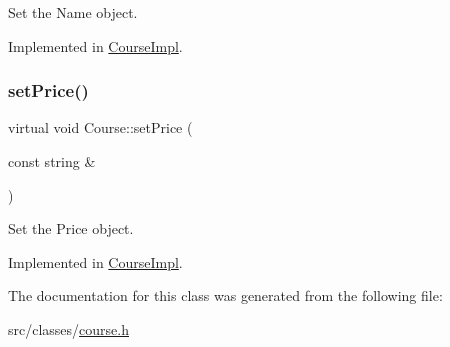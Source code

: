 Set the Name object. 



Implemented in \hyperlink{classCourseImpl_af831a30978ba95ab38c90cb82d14ed7b}{Course\+Impl}.

\mbox{\label{classCourse_a0a04b90e278236abbe5dbe40890cb3d0}} 
\subsubsection{\texorpdfstring{set\+Price()}{setPrice()}}
{\footnotesize\ttfamily virtual void Course\+::set\+Price (\begin{DoxyParamCaption}\item[{const string \&}]{ }\end{DoxyParamCaption})\hspace{0.3cm}{\ttfamily [pure virtual]}}



Set the Price object. 



Implemented in \hyperlink{classCourseImpl_a83623c7a5eff0d028151e4d2126884de}{Course\+Impl}.



The documentation for this class was generated from the following file\+:\begin{DoxyCompactItemize}
\item 
src/classes/\hyperlink{course_8h}{course.\+h}\end{DoxyCompactItemize}
